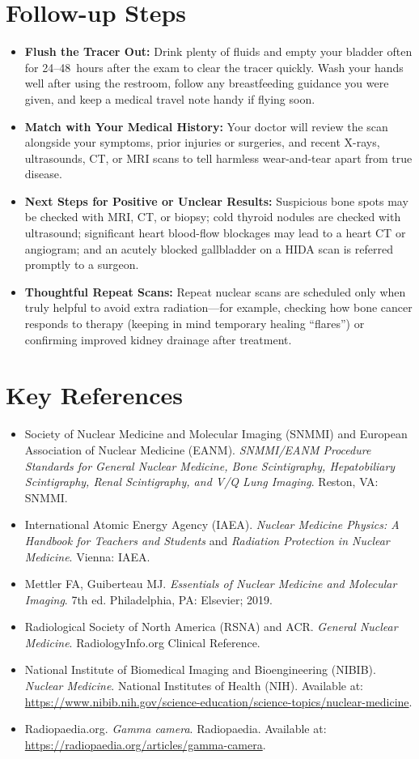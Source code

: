 \section{Follow-up Steps}
\begin{itemize}
\item \textbf{Flush the Tracer Out:} Drink plenty of fluids and empty your bladder often for 24--48~hours after the exam to clear the tracer quickly. Wash your hands well after using the restroom, follow any breastfeeding guidance you were given, and keep a medical travel note handy if flying soon.
\item \textbf{Match with Your Medical History:} Your doctor will review the scan alongside your symptoms, prior injuries or surgeries, and recent X-rays, ultrasounds, CT, or MRI scans to tell harmless wear-and-tear apart from true disease.
\item \textbf{Next Steps for Positive or Unclear Results:} Suspicious bone spots may be checked with MRI, CT, or biopsy; cold thyroid nodules are checked with ultrasound; significant heart blood-flow blockages may lead to a heart CT or angiogram; and an acutely blocked gallbladder on a HIDA scan is referred promptly to a surgeon.
\item \textbf{Thoughtful Repeat Scans:} Repeat nuclear scans are scheduled only when truly helpful to avoid extra radiation---for example, checking how bone cancer responds to therapy (keeping in mind temporary healing ``flares'') or confirming improved kidney drainage after treatment.
\end{itemize}

\section{Key References}
\begin{itemize}
\item Society of Nuclear Medicine and Molecular Imaging (SNMMI) and European Association of Nuclear Medicine (EANM). \textit{SNMMI/EANM Procedure Standards for General Nuclear Medicine, Bone Scintigraphy, Hepatobiliary Scintigraphy, Renal Scintigraphy, and V/Q Lung Imaging}. Reston, VA: SNMMI.
\item International Atomic Energy Agency (IAEA). \textit{Nuclear Medicine Physics: A Handbook for Teachers and Students} and \textit{Radiation Protection in Nuclear Medicine}. Vienna: IAEA.
\item Mettler FA, Guiberteau MJ. \textit{Essentials of Nuclear Medicine and Molecular Imaging}. 7th ed. Philadelphia, PA: Elsevier; 2019.
\item Radiological Society of North America (RSNA) and ACR. \textit{General Nuclear Medicine}. RadiologyInfo.org Clinical Reference.
\item National Institute of Biomedical Imaging and Bioengineering (NIBIB). \textit{Nuclear Medicine}. National Institutes of Health (NIH). Available at: \url{https://www.nibib.nih.gov/science-education/science-topics/nuclear-medicine}.
\item Radiopaedia.org. \textit{Gamma camera}. Radiopaedia. Available at: \url{https://radiopaedia.org/articles/gamma-camera}.
\end{itemize}

